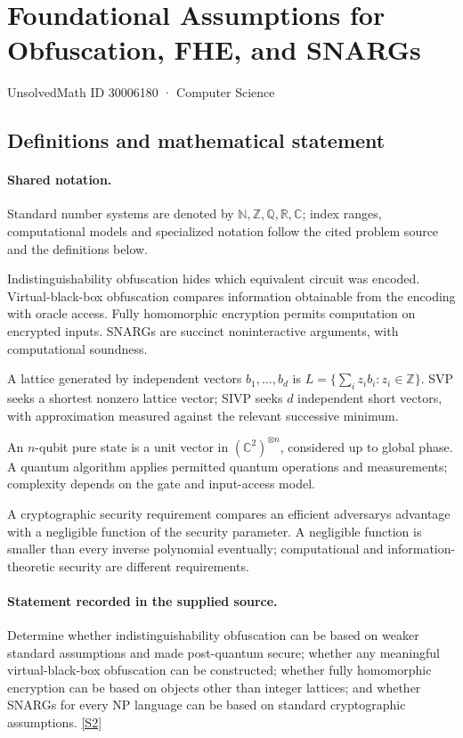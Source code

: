 \documentclass[11pt]{article}
\newcommand{\sref}[2]{\hyperlink{source:#1:#2}{[S#2]}}
\begin{document}
\setcounter{section}{30006179}
\section{Foundational Assumptions for Obfuscation, FHE, and SNARGs}\label{30006180}
{\small\sffamily UnsolvedMath ID 30006180 · Computer Science}
\subsection{Definitions and mathematical statement}

\paragraph{Shared notation.}Standard number systems are denoted by $\mathbb N,\mathbb Z,\mathbb Q,\mathbb R,\mathbb C$; index ranges, computational models and specialized notation follow the cited problem source and the definitions below.


Indistinguishability obfuscation hides which equivalent circuit was encoded. Virtual-black-box obfuscation compares information obtainable from the encoding with oracle access. Fully homomorphic encryption permits computation on encrypted inputs. SNARGs are succinct noninteractive arguments, with computational soundness.

A lattice generated by independent vectors $b_1,\ldots,b_d$ is $L=\{\sum_i z_i b_i:z_i\in\mathbb Z\}$. SVP seeks a shortest nonzero lattice vector; SIVP seeks $d$ independent short vectors, with approximation measured against the relevant successive minimum.

An $n$-qubit pure state is a unit vector in $(\mathbb C^2)^{\otimes n}$, considered up to global phase. A quantum algorithm applies permitted quantum operations and measurements; complexity depends on the gate and input-access model.

A cryptographic security requirement compares an efficient adversary\textquotesingle s advantage with a negligible function of the security parameter. A negligible function is smaller than every inverse polynomial eventually; computational and information-theoretic security are different requirements.
\paragraph{Statement recorded in the supplied source.}
Determine whether indistinguishability obfuscation can be based on weaker standard assumptions and made post-quantum secure; whether any meaningful virtual-black-box obfuscation can be constructed; whether fully homomorphic encryption can be based on objects other than integer lattices; and whether SNARGs for every NP language can be based on standard cryptographic assumptions. \sref{30006180}{2}
\end{document}
